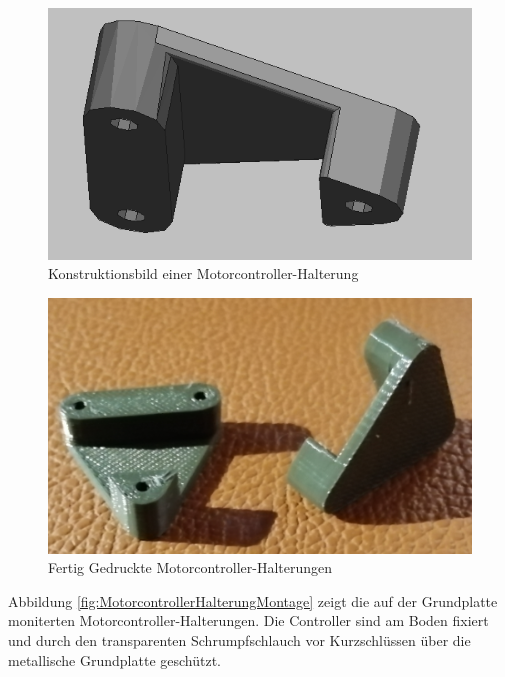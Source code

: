 \begin{minipage}[b]{0.47\textwidth}
\centering
\begin{figure}[H] %
\includegraphics[width=.8\textwidth]{sec2/images/3DAnbaukomponenten/Konstruktionsbilder/MotorcontrollerHalterungKonstruktion} 
\centering
\captionsetup{width=.9\textwidth}
\caption[Konstruktionsbild einer Motorcontroller-Halterung]{Konstruktionsbild einer Motorcontroller-Halterung}
\centering
\label{fig:MotorcontrollerHalterungKonstruktion}
\end{figure}
\end{minipage}
\begin{minipage}[b]{0.47\textwidth}
\begin{figure}[H] %
\includegraphics[width=.8\textwidth]{sec2/images/3DAnbaukomponenten/Druckbilder/MotorcontrollerHalterungDruck} 
\centering
\captionsetup{width=.95\textwidth}
\caption[Gedruckte Motorcontroller-Halterungen]{Fertig Gedruckte Motorcontroller-Halterungen}
\centering
\label{fig:MotorcontrollerHalterungDruck}
\end{figure}
\end{minipage}
\vspace{4mm}

Abbildung \ref{fig:MotorcontrollerHalterungMontage} zeigt die auf der Grundplatte moniterten Motorcontroller-Halterungen. Die Controller sind am Boden fixiert und durch den transparenten Schrumpfschlauch vor Kurzschlüssen über die metallische Grundplatte geschützt.

